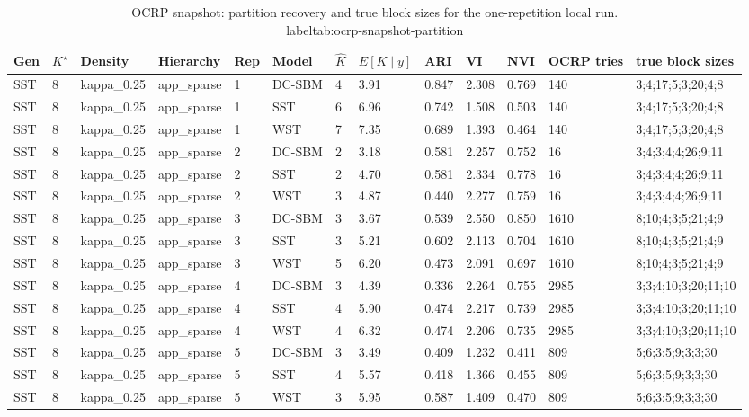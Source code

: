 \begin{table}[!h]
\centering
\caption{OCRP snapshot: partition recovery and true block sizes for the one-repetition local run.\\label{tab:ocrp-snapshot-partition}}
\centering
\begin{tabular}[t]{lllllllllllll}
\toprule
Gen & $K^\star$ & Density & Hierarchy & Rep & Model & $\hat K$ & $E[K\mid y]$ & ARI & VI & NVI & OCRP tries & true block sizes\\
\midrule
SST & 8 & kappa_0.25 & app_sparse & 1 & DC-SBM & 4 & 3.91 & 0.847 & 2.308 & 0.769 & 140 & 3;4;17;5;3;20;4;8\\
SST & 8 & kappa_0.25 & app_sparse & 1 & SST & 6 & 6.96 & 0.742 & 1.508 & 0.503 & 140 & 3;4;17;5;3;20;4;8\\
SST & 8 & kappa_0.25 & app_sparse & 1 & WST & 7 & 7.35 & 0.689 & 1.393 & 0.464 & 140 & 3;4;17;5;3;20;4;8\\
SST & 8 & kappa_0.25 & app_sparse & 2 & DC-SBM & 2 & 3.18 & 0.581 & 2.257 & 0.752 & 16 & 3;4;3;4;4;26;9;11\\
SST & 8 & kappa_0.25 & app_sparse & 2 & SST & 2 & 4.70 & 0.581 & 2.334 & 0.778 & 16 & 3;4;3;4;4;26;9;11\\
SST & 8 & kappa_0.25 & app_sparse & 2 & WST & 3 & 4.87 & 0.440 & 2.277 & 0.759 & 16 & 3;4;3;4;4;26;9;11\\
SST & 8 & kappa_0.25 & app_sparse & 3 & DC-SBM & 3 & 3.67 & 0.539 & 2.550 & 0.850 & 1610 & 8;10;4;3;5;21;4;9\\
SST & 8 & kappa_0.25 & app_sparse & 3 & SST & 3 & 5.21 & 0.602 & 2.113 & 0.704 & 1610 & 8;10;4;3;5;21;4;9\\
SST & 8 & kappa_0.25 & app_sparse & 3 & WST & 5 & 6.20 & 0.473 & 2.091 & 0.697 & 1610 & 8;10;4;3;5;21;4;9\\
SST & 8 & kappa_0.25 & app_sparse & 4 & DC-SBM & 3 & 4.39 & 0.336 & 2.264 & 0.755 & 2985 & 3;3;4;10;3;20;11;10\\
SST & 8 & kappa_0.25 & app_sparse & 4 & SST & 4 & 5.90 & 0.474 & 2.217 & 0.739 & 2985 & 3;3;4;10;3;20;11;10\\
SST & 8 & kappa_0.25 & app_sparse & 4 & WST & 4 & 6.32 & 0.474 & 2.206 & 0.735 & 2985 & 3;3;4;10;3;20;11;10\\
SST & 8 & kappa_0.25 & app_sparse & 5 & DC-SBM & 3 & 3.49 & 0.409 & 1.232 & 0.411 & 809 & 5;6;3;5;9;3;3;30\\
SST & 8 & kappa_0.25 & app_sparse & 5 & SST & 4 & 5.57 & 0.418 & 1.366 & 0.455 & 809 & 5;6;3;5;9;3;3;30\\
SST & 8 & kappa_0.25 & app_sparse & 5 & WST & 3 & 5.95 & 0.587 & 1.409 & 0.470 & 809 & 5;6;3;5;9;3;3;30\\

\end{tabular}
\end{table}
